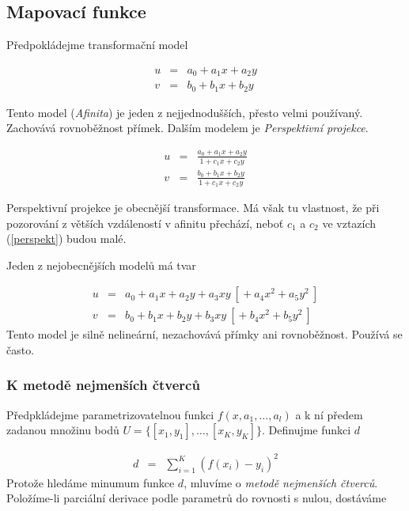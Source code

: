 \subsection{Mapovací funkce}
Předpokládejme transformační model

\begin{eqnarray}
u&=&a_0+a_1x+a_2y\nonumber\\
v&=&b_0+b_1x+b_2y\label{afinita}
\end{eqnarray}

Tento model ({\em Afinita}) je jeden z nejjednodušších, přesto velmi používaný. Zachovává rovnoběžnost přímek. 
Dalším modelem je {\em Perspektivní projekce}.

\begin{eqnarray}
u&=&\frac{a_0+a_1x+a_2y}{1+c_1x+c_2y}\nonumber\\
v&=&\frac{b_0+b_1x+b_2y}{1+c_1x+c_2y}\label{perspekt}
\end{eqnarray}

Perspektivní projekce je obecnější transformace. Má však tu vlastnost, že při pozorování z větších vzdáleností v afinitu
přechází, neboť $c_1$ a $c_2$ ve vztazích (\ref{perspekt}) budou malé.


Jeden z nejobecnějších modelů má tvar

\begin{eqnarray}
u&=&a_0+a_1x+a_2y+a_3xy\ [{}+a_4x^2+a_5y^2\ ]\nonumber\\
v&=&b_0+b_1x+b_2y+b_3xy\ [{}+b_4x^2+b_5y^2\ ]
\end{eqnarray}
Tento model je silně nelineární, nezachovává přímky ani rovnoběžnost. Používá se často.

\subsubsection{K metodě nejmenších čtverců}
Předpkládejme parametrizovatelnou funkci $f(x,a_1,\dots,a_l)$ a k ní předem zadanou množinu bodů $U=\{[x_1,y_1],\dots,[x_K,y_K]\}$.
Definujme funkci $d$ 

\begin{eqnarray}
d&=&\sum\limits_{i=1}^K (f(x_i)-y_i)^2\label{minkvad}
\end{eqnarray}
Protože hledáme minumum funkce $d$, mluvíme o {\em metodě nejmenších čtverců}. Položíme-li 
parciální derivace podle parametrů do rovnosti s
nulou, dostáváme

